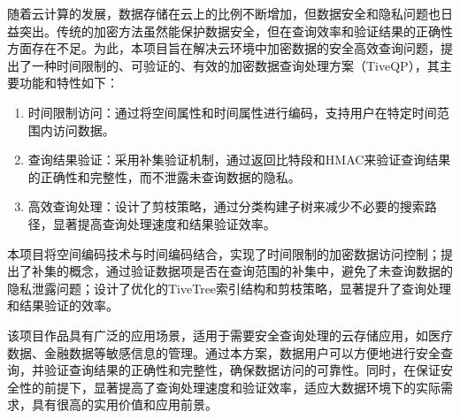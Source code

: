 \documentclass{cumcmthesis}
\numberwithin{equation}{section} %
\numberwithin{figure}{section} %
\numberwithin{table}{section} %
\begin{document}
	
\normalem

\maketitle
 
\newpage
\thispagestyle{empty}
\tableofcontents
\newpage
 
\thispagestyle{empty}
\listoffigures
\newpage

\thispagestyle{empty}
\listoftables
\newpage

\setcounter{page}{1}
 
\begin{cnabstract}
	
    随着云计算的发展，数据存储在云上的比例不断增加，但数据安全和隐私问题也日益突出。传统的加密方法虽然能保护数据安全，但在查询效率和验证结果的正确性方面存在不足。为此，本项目旨在解决云环境中加密数据的安全高效查询问题，提出了一种时间限制的、可验证的、有效的加密数据查询处理方案（TiveQP），其主要功能和特性如下：
    \begin{enumerate}
        \item 时间限制访问：通过将空间属性和时间属性进行编码，支持用户在特定时间范围内访问数据。
        \item 查询结果验证：采用补集验证机制，通过返回比特段和HMAC来验证查询结果的正确性和完整性，而不泄露未查询数据的隐私。
        \item 高效查询处理：设计了剪枝策略，通过分类构建子树来减少不必要的搜索路径，显著提高查询处理速度和结果验证效率。
    \end{enumerate}
    本项目将空间编码技术与时间编码结合，实现了时间限制的加密数据访问控制；提出了补集的概念，通过验证数据项是否在查询范围的补集中，避免了未查询数据的隐私泄露问题；设计了优化的TiveTree索引结构和剪枝策略，显著提升了查询处理和结果验证的效率。
        
    该项目作品具有广泛的应用场景，适用于需要安全查询处理的云存储应用，如医疗数据、金融数据等敏感信息的管理。通过本方案，数据用户可以方便地进行安全查询，并验证查询结果的正确性和完整性，确保数据访问的可靠性。同时，在保证安全性的前提下，显著提高了查询处理速度和验证效率，适应大数据环境下的实际需求，具有很高的实用价值和应用前景。
        
\end{cnabstract}
\end{document}
